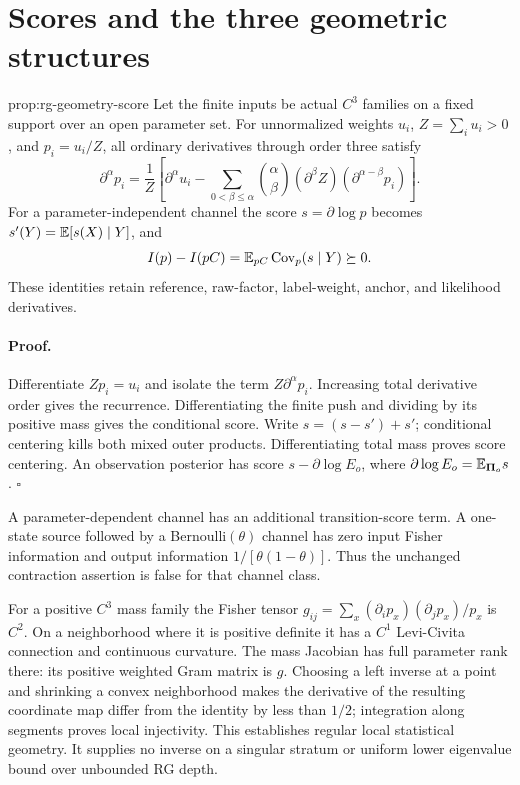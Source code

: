 \section{Scores and the three geometric structures}
\label{sec:rg-geometry-curvatures}

{prop:rg-geometry-score}
Let the finite inputs be actual $C^3$ families on a fixed support over an
open parameter set. For unnormalized weights $u_i$, $Z=\sum_i u_i>0$,
and $p_i=u_i/Z$, all ordinary derivatives through order three satisfy
\begin{equation}
 \partial^\alpha p_i=\frac{1}{Z}
 \left[\partial^\alpha u_i-
 \sum_{0<\beta\leq\alpha}{\alpha\choose\beta}
 (\partial^\beta Z)(\partial^{\alpha-\beta}p_i)\right].
 \label{eq:rg-geometry-derivatives}
\end{equation}
For a parameter-independent channel the score $s=\partial\log p$ becomes
$s'(Y)=\mathbb E[s(X)\mid Y]$, and
\begin{equation}
 I(p)-I(pC)=\mathbb E_{pC}\operatorname{Cov}_p(s\mid Y)\succeq0.
 \label{eq:rg-geometry-fisher-loss}
\end{equation}
These identities retain reference, raw-factor, label-weight, anchor,
and likelihood derivatives. 

\paragraph{Proof.}
Differentiate $Zp_i=u_i$ and isolate the term $Z\partial^\alpha p_i$.
Increasing total derivative order gives the recurrence. Differentiating
the finite push and dividing by its positive mass gives the conditional
score. Write $s=(s-s')+s'$; conditional centering kills both mixed outer
products. Differentiating total mass proves score centering. An observation
posterior has score $s-\partial\log E_o$, where
$\partial\log E_o=\mathbb E_{\boldsymbol\Pi_o}s$.
$\square$

A parameter-dependent channel has an additional transition-score term.
A one-state source followed by a Bernoulli$(\theta)$ channel has zero input
Fisher information and output information $1/[\theta(1-\theta)]$.
Thus the unchanged contraction assertion is false for that channel class.

For a positive $C^3$ mass family the Fisher tensor
$g_{ij}=\sum_x(\partial_i p_x)(\partial_jp_x)/p_x$ is $C^2$.
On a neighborhood where it is positive definite it has a $C^1$ Levi-Civita
connection and continuous curvature. The mass Jacobian has full parameter
rank there: its positive weighted Gram matrix is $g$. Choosing a left
inverse at a point and shrinking a convex neighborhood makes the derivative
of the resulting coordinate map differ from the identity by less than
$1/2$; integration along segments proves local injectivity. This establishes
regular local statistical geometry. It supplies no inverse on a singular
stratum or uniform lower eigenvalue bound over unbounded RG depth.

